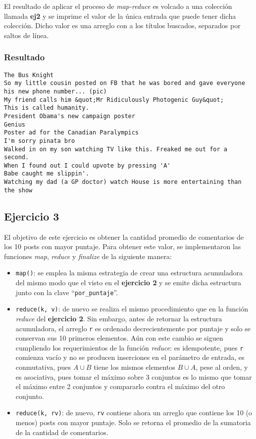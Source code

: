 \documentclass[a4paper]{article}
\begin{document}
El resultado de aplicar el proceso de \textit{map-reduce} es volcado a una
colección llamada \textbf{ej2} y se imprime el valor de la única entrada que
puede tener dicha colección. Dicho valor es una arreglo con a los títulos
buscados, separados por saltos de línea.

\subsubsection{Resultado}

\begin{verbatim}
The Bus Knight
So my little cousin posted on FB that he was bored and gave everyone his new phone number... (pic)
My friend calls him &quot;Mr Ridiculously Photogenic Guy&quot;
This is called humanity.
President Obama's new campaign poster
Genius
Poster ad for the Canadian Paralympics
I'm sorry pinata bro
Walked in on my son watching TV like this. Freaked me out for a second.
When I found out I could upvote by pressing 'A'
Babe caught me slippin'.
Watching my dad (a GP doctor) watch House is more entertaining than the show
\end{verbatim}

\subsection{Ejercicio 3}
El objetivo de este ejercicio es obtener la cantidad promedio de comentarios de
los 10 posts con mayor puntaje. Para obtener este valor, se implementaron las
funciones \textit{map}, \textit{reduce} y \textit{finalize} de la siguiente
manera:
\begin{itemize}
  \item \verb|map()|: se emplea la misma estrategia de crear una estructura
  acumuladora del mismo modo que el visto en el \textbf{ejercicio 2} y se emite
  dicha estructura junto con la clave ``\verb|por_puntaje|''.
  \item \verb|reduce(k, v)|: de nuevo se realiza el mismo procedimiento que en
  la función \textit{reduce} del \textbf{ejercicio 2}. Sin embargo, antes de
  retornar la estructura acumuladora, el arreglo \verb|r| es ordenado
  decrecientemente por puntaje y solo se conservan sus 10 primeros elementos.
  Aún con este cambio se siguen cumpliendo los requerimientos de la función
  \textit{reduce}: es idempotente, pues \verb|r| comienza vacío y no se
  producen inserciones en el parámetro de entrada, es conmutativa, pues $A \cup
  B$ tiene los mismos elementos $B \cup A$, pese al orden, y es asociativa,
  pues tomar el máximo sobre 3 conjuntos es lo mismo que tomar el máximo entre
  2 conjuntos y compararlo contra el máximo del otro conjunto.
  \item \verb|reduce(k, rv)|: de nuevo, \verb|rv| contiene ahora un arreglo que
  contiene los 10 (o menos) posts con mayor puntaje. Solo se retorna el
  promedio de la sumatoria de la cantidad de comentarios.
\end{itemize}
\end{document}
